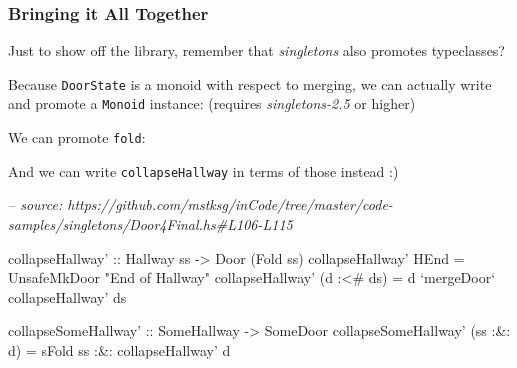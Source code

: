 \documentclass[]{article}
\newenvironment{Shaded}{}{}
\newcommand{\CommentTok}[1]{\textcolor[rgb]{0.38,0.63,0.69}{\textit{#1}}}
\newcommand{\DataTypeTok}[1]{\textcolor[rgb]{0.56,0.13,0.00}{#1}}
\newcommand{\FunctionTok}[1]{\textcolor[rgb]{0.02,0.16,0.49}{#1}}
\newcommand{\NormalTok}[1]{#1}
\newcommand{\OtherTok}[1]{\textcolor[rgb]{0.00,0.44,0.13}{#1}}
\newcommand{\StringTok}[1]{\textcolor[rgb]{0.25,0.44,0.63}{#1}}
\begin{document}
\hypertarget{bringing-it-all-together}{%
\subsubsection{Bringing it All Together}\label{bringing-it-all-together}}

Just to show off the library, remember that \emph{singletons} also promotes
typeclasses?

Because \texttt{DoorState} is a monoid with respect to merging, we can actually
write and promote a \texttt{Monoid} instance: (requires \emph{singletons-2.5} or
higher)

\begin{Shaded}
\end{Shaded}

We can promote \texttt{fold}:

\begin{Shaded}
\end{Shaded}

And we can write \texttt{collapseHallway} in terms of those instead :)

\begin{Shaded}
\begin{Highlighting}[]
\CommentTok{-- source: https://github.com/mstksg/inCode/tree/master/code-samples/singletons/Door4Final.hs#L106-L115}

\NormalTok{collapseHallway'}
\OtherTok{    ::} \DataTypeTok{Hallway}\NormalTok{ ss}
    \OtherTok{->} \DataTypeTok{Door}\NormalTok{ (}\DataTypeTok{Fold}\NormalTok{ ss)}
\NormalTok{collapseHallway' }\DataTypeTok{HEnd}       \FunctionTok{=} \DataTypeTok{UnsafeMkDoor} \StringTok{"End of Hallway"}
\NormalTok{collapseHallway' (d }\FunctionTok{:<#}\NormalTok{ ds) }\FunctionTok{=}\NormalTok{ d }\OtherTok{`mergeDoor`}\NormalTok{ collapseHallway' ds}

\OtherTok{collapseSomeHallway' ::} \DataTypeTok{SomeHallway} \OtherTok{->} \DataTypeTok{SomeDoor}
\NormalTok{collapseSomeHallway' (ss }\FunctionTok{:&:}\NormalTok{ d) }\FunctionTok{=}
\NormalTok{        sFold ss}
    \FunctionTok{:&:}\NormalTok{ collapseHallway' d}
\end{Highlighting}
\end{Shaded}
\end{document}
